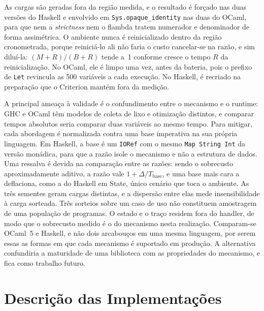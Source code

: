 \documentclass[12pt]{article}
\begin{document}
As cargas são geradas fora da região medida, e o resultado é forçado nas duas
versões do Haskell e envolvido em \texttt{Sys.opaque\_identity} nas duas do
OCaml, para que nem a \textit{strictness} nem o flambda tratem
numerador e denominador de forma assimétrica. O ambiente nunca é reinicializado
dentro da região cronometrada, porque reiniciá-lo ali não faria o custo
cancelar-se na razão, e sim diluí-la: $(M+R)/(B+R)$ tende a~1 conforme cresce o
tempo $R$ da reinicialização. No OCaml, ele é limpo uma vez, antes da bateria,
pois o prefixo de \texttt{Let} revincula as 500 variáveis a cada execução. No
Haskell, é recriado na preparação que o Criterion mantém fora da medição.

A principal ameaça à validade é o confundimento entre o mecanismo e o
runtime: GHC e OCaml têm modelos de coleta de lixo e otimização
distintos, e comparar tempos absolutos seria comparar duas variáveis ao mesmo
tempo. Para mitigar, cada abordagem é normalizada contra uma base imperativa
na sua própria linguagem. Em Haskell, a base é um \texttt{IORef} com o mesmo
\texttt{Map~String~Int} da versão monádica, para que a razão isole o mecanismo
e não a estrutura de dados. Uma ressalva é devida na comparação entre as razões:
sendo o sobrecusto aproximadamente aditivo, a razão vale
$1+\Delta/T_{\mathrm{base}}$, e uma base mais cara a deflaciona,
como a do Haskell em State, único cenário que toca o ambiente. As
três sementes geram cargas distintas, e a dispersão entre elas mede
insensibilidade à carga sorteada. Três sorteios sobre um caso de uso não
constituem amostragem de uma população de programas. O estado e o traço
residem fora do handler, de modo que o sobrecusto medido é o do
mecanismo nesta realização. Comparam-se OCaml~5 e Haskell, e não dois
arcabouços em uma mesma linguagem, por serem essas as formas em que cada
mecanismo é suportado em produção. A alternativa confundiria a maturidade de
uma biblioteca com as propriedades do mecanismo, e fica como trabalho futuro.

\section{Descrição das Implementações}\label{sec:impl}
\end{document}
